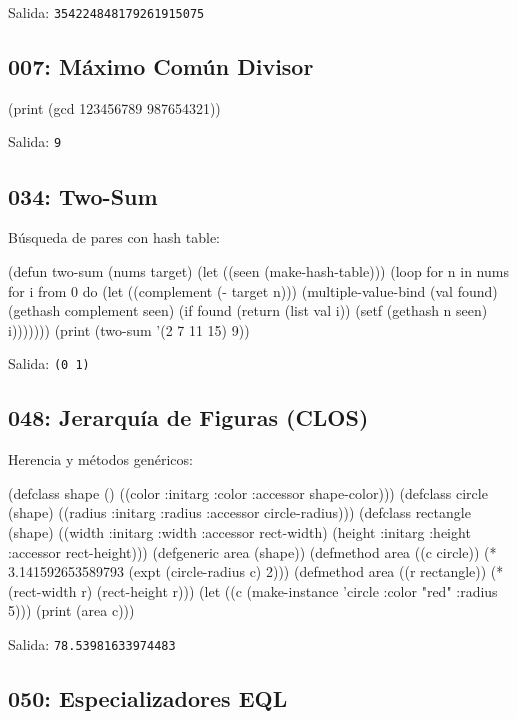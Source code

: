 Salida: \texttt{354224848179261915075}

\subsection*{007: Máximo Común Divisor}

\begin{lispcode}
(print (gcd 123456789 987654321))
\end{lispcode}

Salida: \texttt{9}

\subsection*{034: Two-Sum}

Búsqueda de pares con hash table:

\begin{lispcode}
(defun two-sum (nums target)
  (let ((seen (make-hash-table)))
    (loop for n in nums for i from 0 do
      (let ((complement (- target n)))
        (multiple-value-bind (val found) (gethash complement seen)
          (if found (return (list val i))
              (setf (gethash n seen) i)))))))
(print (two-sum '(2 7 11 15) 9))
\end{lispcode}

Salida: \texttt{(0 1)}

\subsection*{048: Jerarquía de Figuras (CLOS)}

Herencia y métodos genéricos:

\begin{lispcode}
(defclass shape () ((color :initarg :color :accessor shape-color)))
(defclass circle (shape) ((radius :initarg :radius :accessor circle-radius)))
(defclass rectangle (shape) ((width :initarg :width :accessor rect-width)
                             (height :initarg :height :accessor rect-height)))
(defgeneric area (shape))
(defmethod area ((c circle))
  (* 3.141592653589793 (expt (circle-radius c) 2)))
(defmethod area ((r rectangle))
  (* (rect-width r) (rect-height r)))
(let ((c (make-instance 'circle :color "red" :radius 5)))
  (print (area c)))
\end{lispcode}

Salida: \texttt{78.53981633974483}

\subsection*{050: Especializadores EQL}

